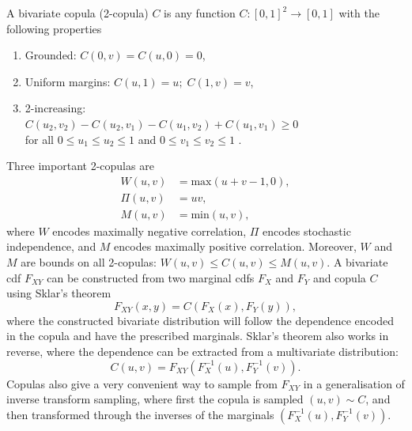 \documentclass{juliacon}
\begin{document}
A bivariate copula (2-copula) $C$ is any function $C:[0,1]^2 \rightarrow [0,  1]$ with the following properties
\begin{enumerate}
  \item Grounded: $C(0,v) = C(u,0) = 0$,
  \item Uniform margins: $C(u,1) = u; \;C(1,v) = v$,
  \item 2-increasing: \\ $C(u_{2},v_{2}) - C_{}(u_{2}, v_{1}) - C(u_{1}, v_{2}) + C(u_{1}, v_{1}) \ge 0$\\ for all $0 \le u_{1} \le u_{2} \le 1$ and $0 \le v_{1} \le v_{2} \le 1$ .
\end{enumerate}
\noindent Three important 2-copulas are
\begin{align*}
  W(u,v) &= \mathrm{max}( u + v-1,0),  \\
  \Pi(u,v) &= uv, \\
  M(u,v) &= \mathrm{min}(u,v),
\end{align*}
\noindent where $W$ encodes maximally negative correlation, $\Pi$ encodes stochastic independence, and $M$ encodes maximally positive correlation. Moreover, $W$ and $M$ are bounds on all 2-copulas: $W(u,v) \leq C(u,v) \leq M(u,v)$. A bivariate cdf $F_{XY}$ can be constructed from two marginal cdfs $F_{X}$ and $F_{Y}$ and copula $C$ using Sklar's theorem
\begin{equation*}
  F_{XY}(x,y) = C(F_{X}(x), F_{Y}(y)),
\end{equation*}
\noindent where the constructed bivariate distribution will follow the dependence encoded in the copula and have the prescribed marginals. Sklar's theorem also works in reverse, where the dependence can be extracted from a multivariate distribution: 
\begin{equation*}
  C(u,v) = F_{XY}(F^{-1}_{X}(u), F^{-1}_{Y}(v)).
\end{equation*}
\noindent Copulas also give a very convenient way to sample from $F_{XY}$ in a generalisation of inverse transform sampling, where first the copula is sampled $(u,v) \sim C$, and then transformed through the inverses of the marginals $(F^{-1}_{X}(u), F^{-1}_{Y}(v))$.
\end{document}
